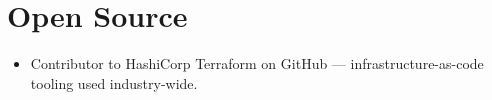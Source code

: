 \section{Open Source}
\begin{itemize}[leftmargin=0.15in, label={}]
  \item{Contributor to HashiCorp Terraform on GitHub --- infrastructure-as-code tooling used industry-wide.}
\end{itemize}
